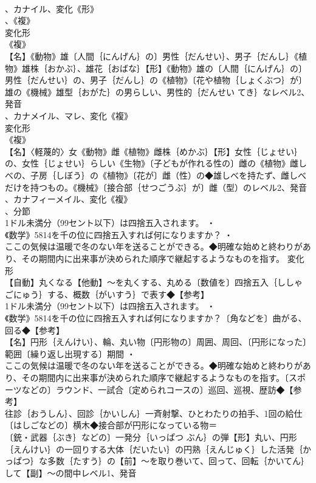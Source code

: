 \documentclass[8pt]{extreport}
\begin{document}
\begin{CJK}{UTF8}{min}
\\	、カナイル、変化《形》
\\	、《複》
\\	変化形 
\\	《複》
\\	【名】《動物》雄〔人間｛にんげん｝の〕男性｛だんせい｝、男子｛だんし｝《植物》雄株｛おかぶ｝、雄花｛おばな｝【形】《動物》雄の〔人間｛にんげん｝の〕男性｛だんせい｝の、男子｛だんし｝の《植物》〔花や植物｛しょくぶつ｝が〕雄の《機械》雄型｛おがた｝の男らしい、男性的｛だんせい てき｝なレベル2、発音
\\	、カナメイル、マレ、変化《複》
\\	変化形 
\\	《複》
\\	【名】〈軽蔑的〉女《動物》雌《植物》雌株｛めかぶ｝【形】女性｛じょせい｝の、女性｛じょせい｝らしい《生物》〔子どもが作れる性の〕雌の《植物》雌しべの、子房｛しぼう｝の《植物》〔花が〕雌（性）の◆雄しべを持たず、雌しべだけを持つもの。《機械》〔接合部｛せつごうぶ｝が〕雌（型）のレベル2、発音
\\	、カナフィーメイル、変化《複》
\\	、分節
\\	1ドル未満分（99セント以下）は四捨五入されます。 ・
\\	《数学》5814を千の位に四捨五入すれば何になりますか？ ・
\\	ここの気候は温暖で冬のない年を送ることができる。◆明確な始めと終わりがあり、その期間内に出来事が決められた順序で継起するようなものを指す。	変化形 
\\	【自動】丸くなる【他動】～を丸くする、丸める〔数値を〕四捨五入｛ししゃ ごにゅう｝する、概数｛がいすう｝で表す◆【参考】
\\	1ドル未満分（99セント以下）は四捨五入されます。 ・
\\	《数学》5814を千の位に四捨五入すれば何になりますか？〔角などを〕曲がる、回る◆【参考】
\\	【名】円形｛えんけい｝、輪、丸い物〔円形物の〕周囲、周回、〔円形になった〕範囲〔繰り返し出現する〕期間 ・
\\	ここの気候は温暖で冬のない年を送ることができる。◆明確な始めと終わりがあり、その期間内に出来事が決められた順序で継起するようなものを指す。〔スポーツなどの〕ラウンド、一試合〔定められコースの〕巡回、巡視、歴訪◆【参考】
\\	往診｛おうしん｝、回診｛かいしん｝一斉射撃、ひとわたりの拍手、1回の給仕〔はしごなどの〕横木◆接合部が円形になっている物＝ 
\\	〔銃・武器｛ぶき｝などの〕一発分｛いっぱつ ぶん｝の弾【形】丸い、円形｛えんけい｝の一回りする大体｛だいたい｝の円熟｛えんじゅく｝した活発｛かっぱつ｝な多数｛たすう｝の【前】～を取り巻いて、回って、回転｛かいてん｝して【副】～の間中レベル1、発音

\end{CJK}
\end{document}
